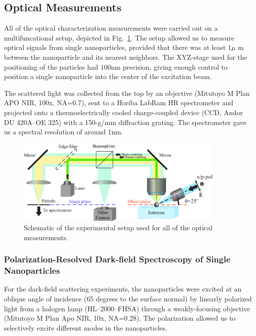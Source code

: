     \subsection{Optical Measurements}
            All of the optical characterization measurements were carried out on a multifuncational setup, depicted in
            Fig.~\ref{fig:expSetup}. The setup allowed us to measure optical signals from single nanoparticles, provided that
            there was at least $1\mu$ m between the nanoparticle and its nearest neighbors. The XYZ-stage used for the
            positioning of the particles had $100$nm precision, giving enough control to position a single nanoparticle into
            the center of the excitation beam.

            The scattered light was collected from the top by an objective (Mitutoyo M Plan APO NIR, 100x, NA=0.7),
            sent to a Horiba LabRam HR spectrometer and projected onto a thermoelectrically cooled charge-coupled device
            (CCD, Andor DU 420A--OE 325) with a 150-g/mm diffraction grating. The spectrometer gave us a spectral resolution
            of around $1$nm.

            \begin{figure}[!ht]
                    \begin{center}
                        \includegraphics[width=0.9\textwidth]{figs/methods/expSetup2.eps}
                    \end{center}
                    \caption{Schematic of the experimental setup used for all of the optical measurements.}
                    \label{fig:expSetup}
            \end{figure}


        \subsubsection{Polarization-Resolved Dark-field Spectroscopy of Single Nanoparticles}
            \label{sec:Darkfield}
                For the dark-field scattering experiments, the nanoparticles were excited at an oblique angle of incidence
            (65 degrees to the surface normal) by linearly polarized light from a halogen lamp (HL--2000--FHSA)
            through a weakly-focusing objective (Mitutoyo M Plan Apo NIR, 10x, NA=0.28). The polarization allowed us to
            selectively excite different modes in the nanoparticles\cite{permyakov2015probing}.


